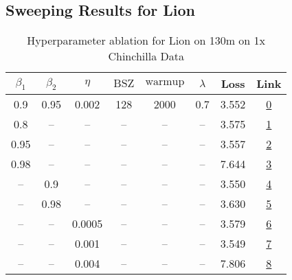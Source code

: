 \subsection{Sweeping Results for Lion}%
\begin{table}[H]
\centering
\caption{Hyperparameter ablation for Lion on 130m on 1x Chinchilla Data}
\label{tab:ablation_lion_130m_1}
\begin{tabular}{cccccccc}
\toprule
$\beta_1$ & $\beta_2$ & $\eta$ & $\mathrm{BSZ}$ & $\mathrm{warmup}$ & $\lambda$ & Loss & Link \\
\midrule
0.9 & 0.95 & 0.002 & 128 & 2000 & 0.7 & 3.552 & \href{https://wandb.ai/stanford-mercury/optimizer-scaling/runs/sweep-130m-2B-lion3532d0lr0.002-wd0.7-minlr0-warmup2000-b10.9-b2-2f88e4}{0} \\
\midrule
0.8 & -- & -- & -- & -- & -- & 3.575 & \href{https://wandb.ai/stanford-mercury/optimizer-scaling/runs/sweep-130m-2B-lion8b138flr0.002-wd0.7-minlr0-warmup2000-b10.8-b2-9d739e}{1} \\
0.95 & -- & -- & -- & -- & -- & 3.557 & \href{https://wandb.ai/stanford-mercury/optimizer-scaling/runs/sweep-130m-2B-lion49977alr0.002-wd0.7-minlr0-warmup2000-b10.95-b-0c8700}{2} \\
0.98 & -- & -- & -- & -- & -- & 7.644 & \href{https://wandb.ai/stanford-mercury/optimizer-scaling/runs/sweep-130m-2B-lion584608lr0.002-wd0.7-minlr0-warmup2000-b10.98-b-bb0378}{3} \\
-- & 0.9 & -- & -- & -- & -- & 3.550 & \href{https://wandb.ai/stanford-mercury/optimizer-scaling/runs/sweep-130m-2B-lionf88c83lr0.002-wd0.7-minlr0-warmup2000-b10.9-b2-3f2e17}{4} \\
-- & 0.98 & -- & -- & -- & -- & 3.630 & \href{https://wandb.ai/stanford-mercury/optimizer-scaling/runs/sweep-130m-2B-lionfc7ef4lr0.002-wd0.7-minlr0-warmup2000-b10.9-b2-27db87}{5} \\
-- & -- & 0.0005 & -- & -- & -- & 3.579 & \href{https://wandb.ai/stanford-mercury/optimizer-scaling/runs/sweep-130m-2B-liony630ce4lr0.0005-wd0.7-minlr0-warmup2000-b10.9--ceaedd}{6} \\
-- & -- & 0.001 & -- & -- & -- & 3.549 & \href{https://wandb.ai/stanford-mercury/optimizer-scaling/runs/sweep-130m-2B-lion5039d1lr0.001-wd0.7-minlr0-warmup2000-b10.9-b2-3938db}{7} \\
-- & -- & 0.004 & -- & -- & -- & 7.806 & \href{https://wandb.ai/stanford-mercury/optimizer-scaling/runs/sweep-130m-2B-liona51523lr0.004-wd0.7-minlr0-warmup2000-b10.9-b2-7563ab}{8} \\

\end{tabular}
\end{table}
